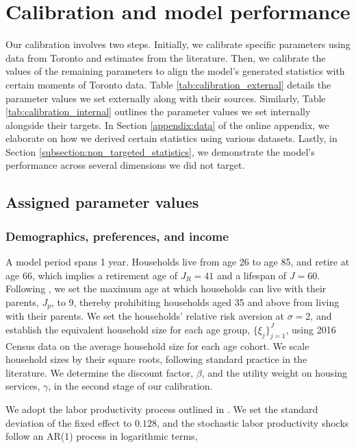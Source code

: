 \documentclass[parskip=full]{article}
\begin{document}
\section{Calibration and model performance}\label{sec:calibration}

Our calibration involves two steps. Initially, we calibrate specific parameters using data from Toronto and estimates from the literature. Then, we calibrate the values of the remaining parameters to align the model's generated statistics with certain moments of Toronto data. Table \ref{tab:calibration_external} details the parameter values we set externally along with their sources. Similarly, Table \ref{tab:calibration_internal} outlines the parameter values we set internally alongside their targets. In Section \ref{appendix:data} of the online appendix, we elaborate on how we derived certain statistics using various datasets. Lastly, in Section \ref{subsection:non_targeted_statistics}, we demonstrate the model's performance across several dimensions we did not target.

\subsection{Assigned parameter values}

\subsubsection{Demographics, preferences, and income}
A model period spans 1 year. Households live from age 26 to age 85, and retire at age 66, which implies a retirement age of $J_{R}=41$ and a lifespan of $J=60$. Following \citet{rs-2023}, we set the maximum age at which households can live with their parents, $J_{p}$, to 9, thereby prohibiting households aged 35 and above from living with their parents. We set the households' relative risk aversion at $\sigma=2$, and establish the equivalent household size for each age group, $\{\xi_{j}\}_{j=1}^{J}$, using 2016 Census data on the average household size for each age cohort. We scale household sizes by their square roots, following standard practice in the literature. We determine the discount factor, $\beta$, and the utility weight on housing services, $\gamma$, in the second stage of our calibration.

We adopt the labor productivity process outlined in \citet{gkkoc}. We set the standard deviation of the fixed effect to $0.128$, and the stochastic labor productivity shocks follow an AR(1) process in logarithmic terms,
\end{document}
